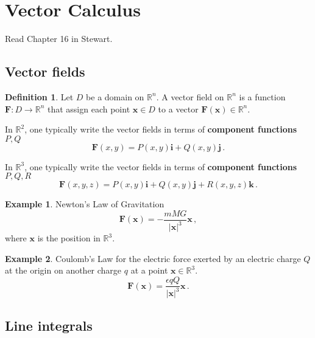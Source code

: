 \documentclass[
]{article}
\theoremstyle{definition}
\newtheorem{definition}{Definition}[section]
\theoremstyle{definition}
\newtheorem{example}{Example}[section]
\theoremstyle{definition}
\theoremstyle{definition}
\theoremstyle{remark}
\begin{document}
\newpage

\hypertarget{vector-calculus}{%
\section{Vector Calculus}\label{vector-calculus}}

Read Chapter 16 in Stewart.

\hypertarget{vector-fields}{%
\subsection{Vector fields}\label{vector-fields}}

\begin{definition}
Let \(D\) be a domain on \(\mathbb{R}^n\).
A vector field on \(\mathbb{R}^n\) is a function \(\mathbf{F}: D \to \mathbb{R}^n\)
that assign each point \(\mathbf{x}\in D\) to a vector \(\mathbf{F}(\mathbf{x}) \in \mathbb{R}^n\).
\end{definition}

In \(\mathbb{R}^2\), one typically write the vector fields in terms of \textbf{component functions} \(P, Q\)
\[\mathbf{F}(x,y) = P(x,y) \mathbf{i} + Q(x,y) \mathbf{j}\,.\]

In \(\mathbb{R}^3\), one typically write the vector fields in terms of \textbf{component functions} \(P, Q, R\)
\[\mathbf{F}(x,y,z) = P(x,y) \mathbf{i} + Q(x,y) \mathbf{j} + R(x,y,z) \mathbf{k}\,.\]

\begin{example}
Newton's Law of Gravitation
\begin{equation*}
    \mathbf{F}(\mathbf{x}) = - \frac{m M G}{| \mathbf{x}|^3 } \mathbf{x} \,,
\end{equation*}
where \(\mathbf{x}\) is the position in \(\mathbb{R}^3\).
\end{example}

\begin{example}
Coulomb's Law for the electric force exerted by an electric charge \(Q\)
at the origin on another charge \(q\) at a point \(\mathbf{x}\in \mathbb{R}^3\).
\begin{equation*}
    \mathbf{F}(\mathbf{x}) = \frac{ \epsilon q Q}{|\mathbf{x}|^3} \mathbf{x} \,.
\end{equation*}
\end{example}

\hypertarget{line-integrals}{%
\subsection{Line integrals}\label{line-integrals}}
\end{document}
